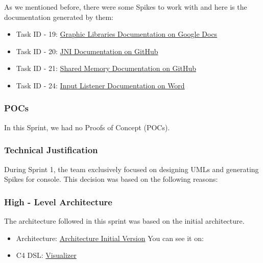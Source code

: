 As we mentioned before, there were some Spikes to work with and here is the documentation generated by them:

\begin{itemize}    
    \item Task ID - 19: \href{https://docs.google.com/document/d/1a6wyQA0LM5thyAfOsWnkG-fTLcThvrsVPOGmFcoqkvw/edit?usp=sharing}{Graphic Libraries Documentation on Google Docs}
    \item Task ID - 20: \href{https://github.com/Pending-Name-21/console/tree/vm-spikes/jni_spike}{JNI Documentation on GitHub}
    \item Task ID - 21: \href{https://github.com/Pending-Name-21/console/blob/vm-spikes/shared-memory/README.md}{Shared Memory Documentation on GitHub}
    \item Task ID - 24: \href{https://universidadsalesian-my.sharepoint.com/:w:/g/personal/axel_ayala_9412013_usalesiana_edu_bo/EZlHobuXqW5AmffmDNnGaKYBdpordz1QlVJk88Pe_6S7HQ?e=DymfMq}{Input Listener Documentation on Word}
\end{itemize}

\subsubsection{POCs}

In this Sprint, we had no Proofs of Concept (POCs).

\subsubsection{Technical Justification}

During Sprint 1, the team exclusively focused on designing UMLs and
generating Spikes for console. This decision was based on the following reasons:

\subsubsection{High - Level Architecture}

The architecture followed in this sprint was based on the initial architecture.

\begin{itemize}
    \item Architecture: \href{https://github.com/Pending-Name-21/arquitecture/pull/1/files}{Architecture Initial Version}
    You can see it on: 
    \item C4 DSL: \href{https://structurizr.com/dsl}{Visualizer}
\end{itemize}

